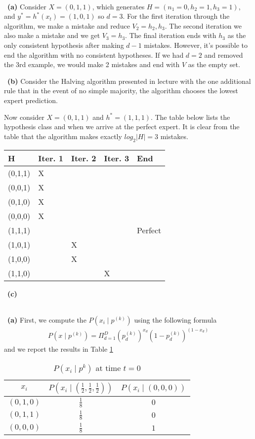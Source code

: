 \documentclass[a4 paper, 15pt]{article}
\numberwithin{equation}{section}
\newcommand{\problem}[1]{~\\\fbox{\textbf{Problem #1}}\newline\newline}
\newcommand{\subproblem}[1]{~\newline\textbf{(#1)}}
\begin{document}
\newpage
\problem{2}
\subproblem{a} Consider $X = (0,1,1)$, which generates $H = (n_1=0, h_2=1, h_3=1)$, and $y^* = h^*(x_t) = (1,0,1)$ so $d = 3$.  For the first iteration through the algorithm, we make a mistake and reduce $V_2 = {h_2, h_3}$. The second iteration we also make a mistake and we get $V_3 = {h_3}$. The final iteration ends with $h_3$ as the only consistent hypothesis after making $d-1$ mistakes.  However, it's possible to end the algorithm with no consistent hypotheses.  If we had $d=2$ and removed the 3rd example, we would make 2 mistakes and end with $V$ as the empty set.
\par
\subproblem{b} Consider the Halving algorithm presented in lecture with the one additional rule that in the event of no simple majority, the algorithm chooses the lowest expert prediction.
\par
Now consider $X=(0,1,1)$ and $h^*=(1,1,1)$.  The table below lists the hypothesis class and when we arrive at the perfect expert.  It is clear from the table that the algorithm makes exactly $log_2|H| = 3$ mistakes.
\vspace{1em}
\begin{tabular}{lllll}
	\hline
	H & Iter. 1 & Iter. 2 & Iter. 3 & End \\
	\hline \hline
	(0,1,1) & X &  & & \\
	(0,0,1) & X & & & \\
	(0,1,0) & X & & & \\
	(0,0,0) & X & & & \\
	(1,1,1) &  & & & Perfect \\
	(1,0,1) &  & X & & \\
	(1,0,0) &  & X & & \\
	(1,1,0) &  & & X & \\
	\hline

\end{tabular}

\subproblem{c}

\newpage
\problem{3}
\subproblem{a}
First, we compute the $P(x_i\mid p^{(k)})$ using the following formula
\begin{align*}
  P(x\mid p^{(k)}) = \Pi^D_{d=1} (p_d^{(k)})^{x_d}(1-p_d^{(k)})^{(1-x_d)}
\end{align*}
and we report the results in Table \ref{tab1}
\begin{table}[H]
  \centering
  \begin{tabular}{c|c c}\hline
  $x_i$ & $P(x_i\mid  \left(\frac{1}{2},\frac{1}{2},\frac{1}{2} \right) )$ & $P(x_i\mid  \left(0,0,0 \right) )$ \\
  \hline
  \hline
  $\left(0,1,0 \right)$ & $\frac{1}{8}$ & $0$ \\

  $\left(0,1,1 \right)$ & $\frac{1}{8}$ & $0$ \\

  $\left(0,0,0 \right)$ & $\frac{1}{8}$ & $1$ \\
  \hline
  \end{tabular}
  \caption{$P(x_i\mid p^{k})$ at time $t=0$}
  \label{tab1}
\end{table}
\end{document}
